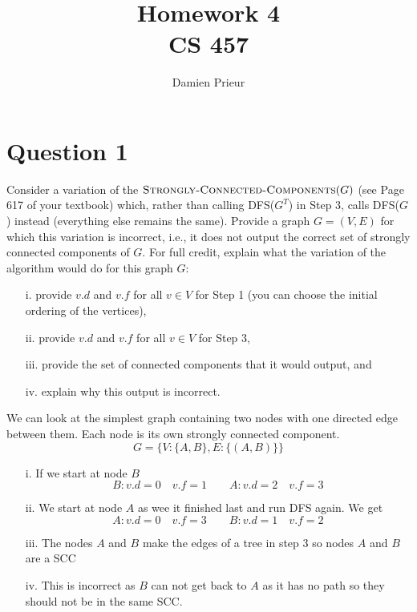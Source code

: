 \documentclass{article}
\author{Damien Prieur}
\title{Homework 4 \\ CS 457}
\date{}
\begin{document}
\maketitle

\section*{Question 1}
Consider a variation of the $\textsc{Strongly-Connected-Components}(G)$ (see Page 617 of your textbook) which, rather than calling DFS($G^T$) in Step 3, calls DFS($G$) instead (everything else remains the same).
Provide a graph $G=(V, E)$ for which this variation is incorrect, i.e., it does not output the correct set of strongly connected components of $G$.
For full credit, explain what the variation of the algorithm would do for this graph $G$:
\begin{itemize}
\item[i.] provide $v.d$ and $v.f$ for all $v\in V$ for Step 1 (you can choose the initial ordering of the vertices),
\item[ii.] provide $v.d$ and $v.f$ for all $v\in V$ for Step 3,
\item[iii.] provide the set of connected components that it would output, and
\item[iv.] explain why this output is incorrect.
\end{itemize}

We can look at the simplest graph containing two nodes with one directed edge between them. Each node is its own strongly connected component.
$$G=\{V:\{A,B\}, E:\{(A,B)\}\}$$

\begin{itemize}
\item[i.] If we start at node $B$ \
$$B : v.d = 0 \quad v.f = 1 \qquad A : v.d = 2 \quad v.f = 3$$
\item[ii.] We start at node $A$ as wee it finished last and run DFS again. We get \\
$$A : v.d = 0 \quad v.f = 3 \qquad B : v.d = 1 \quad v.f = 2$$
\item[iii.] The nodes $A$ and $B$ make the edges of a tree in step 3 so nodes $A$ and $B$ are a SCC
\item[iv.] This is incorrect as $B$ can not get back to $A$ as it has no path so they should not be in the same SCC.
\end{itemize}
\end{document}
